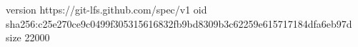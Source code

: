 version https://git-lfs.github.com/spec/v1
oid sha256:c25e270ce9c0499f305315616832fb9bd8309b3c62259e615717184dfa6eb97d
size 22000
